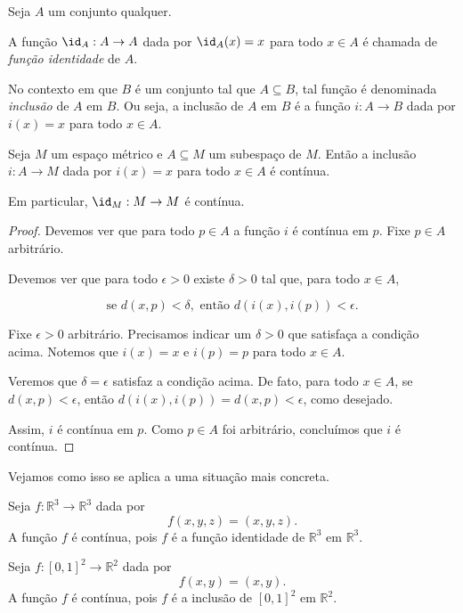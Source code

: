 \begin{definition}
    Seja $A$ um conjunto qualquer.

    A função $\id_A: A\rightarrow A$ dada por $\id_A(x) = x$ para todo $x \in A$ é chamada de \emph{função identidade} de $A$.

    No contexto em que $B$ é um conjunto tal que $A\subseteq B$, tal função é denominada \emph{inclusão} de $A$ em $B$.
    Ou seja, a inclusão de $A$ em $B$ é a função $i: A\rightarrow B$ dada por $i(x) = x$ para todo $x \in A$.
\end{definition}

\begin{proposition}
    Seja $M$ um espaço métrico e $A\subseteq M$ um subespaço de $M$.
    Então a inclusão $i: A\rightarrow M$ dada por $i(x) = x$ para todo $x \in A$ é contínua.

    Em particular, $\id_M: M\rightarrow M$ é contínua.
\end{proposition}
\begin{proof}
    Devemos ver que para todo $p\in A$ a função $i$ é contínua em $p$.
    Fixe $p\in A$ arbitrário.

    Devemos ver que para todo $\epsilon>0$ existe $\delta>0$ tal que, para todo $x\in A$,

    \[
        \text{se } d(x, p) < \delta, \text{ então } d(i(x), i(p)) < \epsilon.
    \]

    Fixe $\epsilon>0$ arbitrário.
    Precisamos indicar um $\delta>0$ que satisfaça a condição acima.
    Notemos que $i(x) = x$ e $i(p) = p$ para todo $x\in A$.
    
    Veremos que $\delta = \epsilon$ satisfaz a condição acima.
    De fato, para todo $x \in A$, se $d(x, p) < \epsilon$, então $d(i(x), i(p)) = d(x, p) < \epsilon$, como desejado.

    Assim, $i$ é contínua em $p$.
    Como $p\in A$ foi arbitrário, concluímos que $i$ é contínua.
\end{proof}

Vejamos como isso se aplica a uma situação mais concreta.

\begin{example}
    Seja $f: \mathbb R^3\rightarrow \mathbb R^3$ dada por
    \[
        f(x, y, z) = (x, y, z).
    \]
    A função $f$ é contínua, pois $f$ é a função identidade de $\mathbb R^3$ em $\mathbb R^3$.
\end{example}

\begin{example}
    Seja $f: [0, 1]^2\rightarrow \mathbb R^2$ dada por
    \[
        f(x, y) = (x, y).
    \]
    A função $f$ é contínua, pois $f$ é a inclusão de $[0, 1]^2$ em $\mathbb R^2$.
\end{example}



